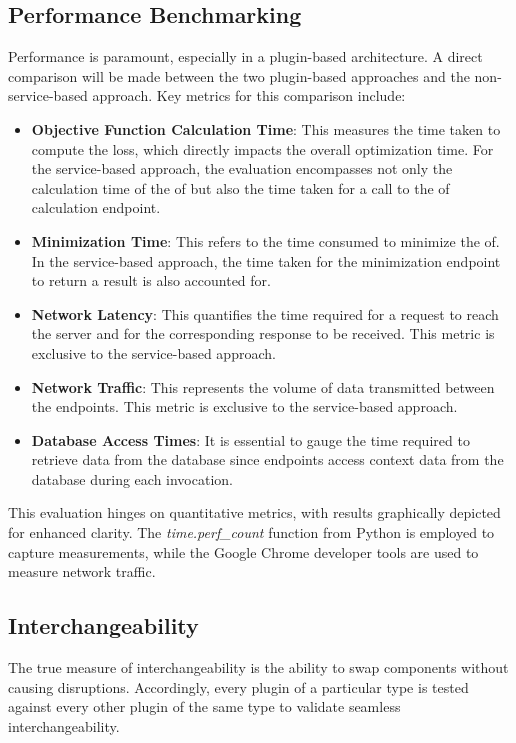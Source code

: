 \documentclass[
  a4paper,  %
  twoside,  %
  bibliography=totoc,
  headsepline,
  cleardoublepage=empty,
  parskip=half,
  draft=false
]{scrbook}
\begin{document}
\subsection{Performance Benchmarking}
Performance is paramount, especially in a plugin-based architecture.
A direct comparison will be made between the two plugin-based approaches and the non-service-based approach.
Key metrics for this comparison include:

\begin{itemize}
\item \textbf{Objective Function Calculation Time}: This measures the time taken to compute the loss, which directly impacts the overall optimization time.
For the service-based approach, the evaluation encompasses not only the calculation time of the \gls{of} but also the time taken for a call to the \gls{of} calculation endpoint.

\item \textbf{Minimization Time}: This refers to the time consumed to minimize the \gls{of}.
In the service-based approach, the time taken for the minimization endpoint to return a result is also accounted for.

\item \textbf{Network Latency}: This quantifies the time required for a request to reach the server and for the corresponding response to be received.
This metric is exclusive to the service-based approach.

\item \textbf{Network Traffic}: This represents the volume of data transmitted between the endpoints.
This metric is exclusive to the service-based approach.

\item \textbf{Database Access Times}: It is essential to gauge the time required to retrieve data from the database since endpoints access context data from the database during each invocation.
\end{itemize}

This evaluation hinges on quantitative metrics, with results graphically depicted for enhanced clarity.
The \emph{time.perf\_count} function from Python is employed to capture measurements, while the Google Chrome developer tools are used to measure network traffic.

\subsection{Interchangeability}
The true measure of interchangeability is the ability to swap components without causing disruptions.
Accordingly, every plugin of a particular type is tested against every other plugin of the same type to validate seamless interchangeability.
\end{document}

